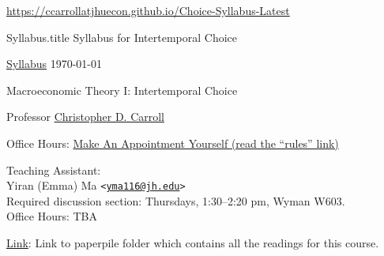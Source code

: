 \documentclass{\econtex}\newcommand{\texname}{Syllabus}
\begin{document}
\large
\begin{center}{{\tiny \url{https://ccarrollatjhuecon.github.io/Choice-Syllabus-Latest}}}\end{center}

\begin{verbatimwrite}{\texname.title}
Syllabus for Intertemporal Choice
\end{verbatimwrite}

\thispagestyle{empty}

\newenvironment{blockpar}{\par\begin{minipage}{\textwidth}
\setlength{\parskip}{.5\baselineskip plus 1pt minus 1pt}}{\end{minipage}}

\pagestyle{plain}
\thispagestyle{empty}

\begin{center}
{\tiny \href{https://ccarrollatjhuecon.github.io/Choice-Syllabus-Latest}{\texname} \hfill \today}

{\LARGE Macroeconomic Theory I: Intertemporal Choice}
\medskip\medskip\medskip\medskip

\smallskip

Professor \href{http://www.econ2.jhu.edu/people/ccarroll}{Christopher D. Carroll}

\medskip

\medskip\medskip
Office Hours: \href{https://calendar.google.com/calendar/selfsched?sstoken=UUNxMjFfNUtvakNSfGRlZmF1bHR8NjZhZDA0NmI3YmE5N2Y5N2Y3YjE2MzI5ZDg5YTYwYjQ}{Make An Appointment Yourself (read the ``rules'' link)}

\medskip\medskip\medskip
\small
Teaching Assistant:  \\
Yiran (Emma) Ma \texttt{<\href{mailto:yma116@jh.edu}{\texttt{yma116@jh.edu}}>}
\\ Required discussion section: Thursdays, 1:30--2:20 pm, Wyman W603.
\\ Office Hours: TBA
\normalsize
\medskip

\small
\href{https://app.paperpile.com/econark-related-tkUex~5rSTa26MXwWY5FtZQ/all}{Link}: Link to paperpile folder which contains all the readings for this course.

\end{center}
\end{document}
